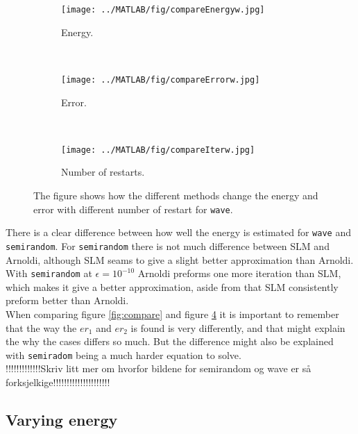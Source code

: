 \begin{figure}[H]
        \centering
        \begin{subfigure}[b]{0.3\textwidth}
                \texttt{[image: ../MATLAB/fig/compareEnergyw.jpg]}
                \caption{ Energy. }
                \label{fig:compareEnergyw}
        \end{subfigure}
        ~
        \begin{subfigure}[b]{0.3\textwidth}
                \texttt{[image: ../MATLAB/fig/compareErrorw.jpg]}
                \caption{ Error. }
                \label{fig:compareErrorw}
        \end{subfigure}
        ~
        \begin{subfigure}[b]{0.3\textwidth}
                \texttt{[image: ../MATLAB/fig/compareIterw.jpg]}
                \caption{ Number of restarts.  }
                \label{fig:compareIterw}
        \end{subfigure}
        \caption{ The figure shows how the different methods change the energy and error with different number of restart for \texttt{wave}.  }
        \label{fig:comparew}
\end{figure}

There is a clear difference between how well the energy is estimated for \texttt{wave} and \texttt{semirandom}. For \texttt{semirandom} there is not much difference between SLM and Arnoldi, although SLM seams to give a slight better approximation than Arnoldi. With \texttt{semirandom} at $\epsilon = 10^{-10}$ Arnoldi preforms one more iteration than SLM, which makes it give a better approximation, aside from that SLM consistently preform better than Arnoldi.\\
When comparing figure \ref{fig:compare} and figure \ref{fig:comparew} it is important to remember that the way the $er_1$ and $er_2$ is found is very differently, and that might explain the why the cases differs so much. But the difference might also be explained with \texttt{semiradom} being a much harder equation to solve.\\
!!!!!!!!!!!!!Skriv litt mer om hvorfor bildene for semirandom og wave er så forksjelkige!!!!!!!!!!!!!!!!!!!!!\\

\subsection{Varying energy}%


